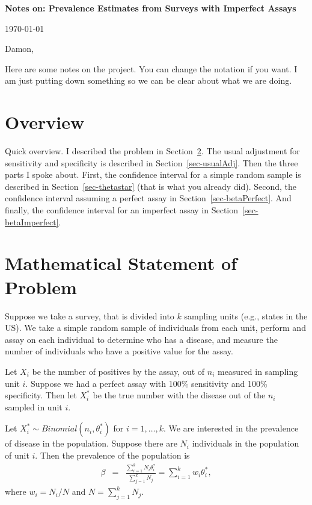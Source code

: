 \documentclass{article}
\begin{document}
{\bf \large Notes on: Prevalence Estimates from Surveys with Imperfect Assays}

\today



Damon,

Here are some notes on the project. You can change the notation if you want. I am just putting down something so we can be clear about what we are doing.

\section{Overview}

Quick overview. I described the problem in Section~\ref{sec-math}. The usual adjustment for sensitivity and specificity is described in Section~\ref{sec-usualAdj}. Then the three parts I spoke about. First, the confidence interval for a simple random sample is described in Section~\ref{sec-thetastar} (that is what you already did). Second, the confidence interval assuming a perfect assay in Section~\ref{sec-betaPerfect}. And finally, the
confidence interval for an imperfect assay in Section~\ref{sec-betaImperfect}.


\section{Mathematical Statement of Problem}
\label{sec-math}

Suppose we take a survey, that is divided into $k$ sampling units (e.g., states in the US).
We take a simple random sample of individuals from each unit, perform and assay on each individual to determine who has a disease, and measure the number of individuals who have a positive value for the assay.

Let $X_i$ be the number of positives by the assay, out of $n_i$ measured in sampling unit $i$.
Suppose we had a perfect assay with 100\% sensitivity and 100\% specificity. Then let $X_i^*$ be the true number with the disease out of the $n_i$ sampled in unit $i$.

Let $X_i^* \sim Binomial(n_i, \theta_i^*)$ for $i=1,\ldots,k$. We are interested in the prevalence of disease in the population. Suppose there are $N_i$ individuals in the population of unit $i$. Then the prevalence of the population is
\begin{eqnarray*}
\beta & = & \frac{ \sum_{i=1}^{k} N_i \theta_i^* }{ \sum_{j=1}^{k} N_j }  =  \sum_{i=1}^{k} w_i \theta_i^*,
\end{eqnarray*}
where $w_i = N_i/N$ and $N=\sum_{j=1}^{k} N_j$.
\end{document}
